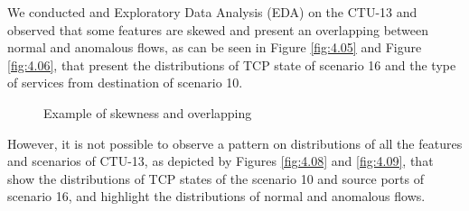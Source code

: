 We conducted and Exploratory Data Analysis (EDA) on the CTU-13 and observed that some features are skewed and present an overlapping between normal and anomalous flows, as can be seen in Figure \ref{fig:4.05} and Figure \ref{fig:4.06}, that present the distributions of TCP state of scenario 16 and the type of services from destination of scenario 10.

\begin{figure}[!htb]
	\centering
	\caption[Skewness and Overlapping]{Example of skewness and overlapping}
	\label{fig:4.07}
\end{figure}

However, it is not possible to observe a pattern on distributions of all the features and scenarios of CTU-13, as depicted by Figures \ref{fig:4.08} and \ref{fig:4.09}, that show the distributions of TCP states of the scenario 10 and source ports of scenario 16, and highlight the distributions of normal and anomalous flows.

